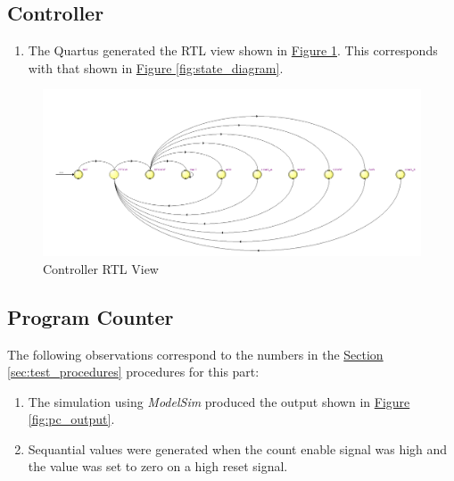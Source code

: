 
\FloatBarrier \subsection{Controller} %
\label{sub:controller}

\begin{enumerate}
    \item The Quartus generated the RTL view shown in \hyperref[fig:controller_rtl]{Figure \ref*{fig:controller_rtl}}.
    This corresponds with that shown in \hyperref[fig:state_diagram]{Figure \ref*{fig:state_diagram}}.
\end{enumerate}

\begin{figure}
    \includegraphics[width=\textwidth]{images/controller_rtl.png}
    \caption{Controller RTL View \label{fig:controller_rtl}}
\end{figure}


\FloatBarrier \subsection{Program Counter} %
\label{sub:program_counter}

The following observations correspond to the numbers in the \hyperref[sec:test_procedures]{Section \ref*{sec:test_procedures}} procedures for this part:

\begin{enumerate}
    \item The simulation using \emph{ModelSim} produced the output shown in \hyperref[fig:pc_output]{Figure \ref*{fig:pc_output}}.
    \item Sequantial values were generated when the count enable signal was high and the value was set to zero on a high reset signal.
\end{enumerate}

